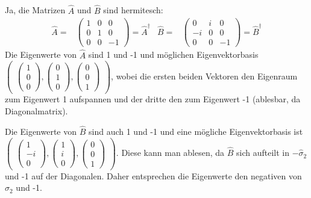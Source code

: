 \documentclass[11pt, ngerman, fleqn, DIV=15, headinclude]{scrartcl}
\begin{document}
\subsection{}

Ja, die Matrizen $\hat{A}$ und $\hat{B}$ sind hermitesch:
\begin{align*}
	\hat{A}=&\begin{pmatrix}1&0&0\\0&1&0\\0&0&-1\end{pmatrix}=\hat{A}^{\dag} & \hat{B}=&\begin{pmatrix}0&i&0\\-i&0&0\\0&0&-1\end{pmatrix}=\hat{B}^{\dag}
\end{align*}
Die Eigenwerte von $\hat{A}$ sind 1 und -1 und möglichen Eigenvektorbasis $\begin{pmatrix}\begin{pmatrix}1\\0\\0\end{pmatrix}, \begin{pmatrix}0\\1\\0\end{pmatrix} , \begin{pmatrix}0\\0\\1\end{pmatrix}\end{pmatrix}$, wobei die ersten beiden Vektoren den Eigenraum zum Eigenwert 1 aufspannen und der dritte den zum Eigenwert -1 (ablesbar, da Diagonalmatrix).

Die Eigenwerte von $\hat{B}$ sind auch 1 und -1 und eine mögliche Eigenvektorbasis ist $\begin{pmatrix} \begin{pmatrix}1\\-i\\0\end{pmatrix},\begin{pmatrix}1\\i\\0\end{pmatrix},\begin{pmatrix}0\\0\\1\end{pmatrix}\end{pmatrix}$.
	Diese kann man ablesen, da $\hat{B}$ sich aufteilt in $-\hat{\sigma}_2$ und -1 auf der Diagonalen. Daher entsprechen die Eigenwerte den negativen von $\hat{\sigma}_2$ und -1.
\end{document}
